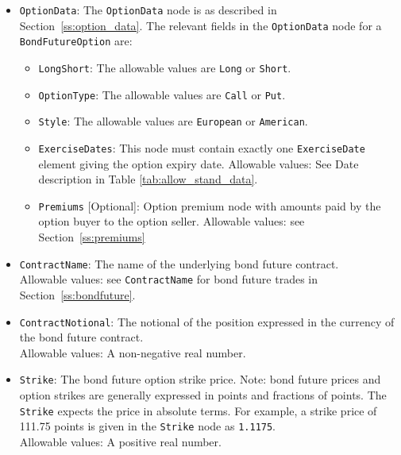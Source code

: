 \begin{itemize}

\item \lstinline!OptionData!:
  The \lstinline!OptionData! node is as described in Section~\ref{ss:option_data}.
  The relevant fields in the \lstinline!OptionData! node for a \lstinline!BondFutureOption! are:
  \begin{itemize}
  \item \lstinline!LongShort!: The allowable values are \lstinline!Long! or \lstinline!Short!.
  \item \lstinline!OptionType!: The allowable values are \lstinline!Call! or \lstinline!Put!.
  \item \lstinline!Style!: The allowable values are \lstinline!European! or \lstinline!American!.
  \item \lstinline!ExerciseDates!:
    This node must contain exactly one \lstinline!ExerciseDate! element giving the option expiry date.
    Allowable values: See Date description in Table \ref{tab:allow_stand_data}.
  \item \lstinline!Premiums! [Optional]:
    Option premium node with amounts paid by the option buyer to the option seller.
    Allowable values: see Section~\ref{ss:premiums}
  \end{itemize}
 
\item \lstinline!ContractName!: The name of the underlying bond future contract. \\
  Allowable values: see \lstinline!ContractName! for bond future trades in Section~\ref{ss:bondfuture}.

\item \lstinline!ContractNotional!: The notional of the position expressed in the currency of the bond future contract. \\
  Allowable values: A non-negative real number.

\item \lstinline!Strike!: The bond future option strike price.
  Note: bond future prices and option strikes are generally expressed in points and fractions of points.
        The \lstinline!Strike! expects the price in absolute terms.
        For example, a strike price of 111.75 points is given in the \lstinline!Strike! node as \lstinline!1.1175!. \\
  Allowable values: A positive real number.

\end{itemize}

